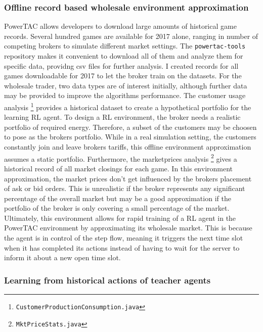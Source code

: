 \subsubsection{Offline record based wholesale environment approximation}%
\label{ssub:offline_record_based_wholesale_environment_approximation}

\ac{PowerTAC} allows developers to download large amounts of historical game records. Several hundred games are
available for 2017 alone, ranging in number of competing brokers to simulate different market settings. The
\texttt{powertac-tools} repository makes it convenient to download all  of them and analyze them for specific data,
providng csv files for further analysis. I created records for all games downloadable for 2017 to let the broker train on
the datasets. For the wholesale trader, two data types are of interest initially, although further data may be provided
to improve the algorithms performance. The customer usage analysis
\footnote{\texttt{CustomerProductionConsumption.java}}
provides a historical dataset to create a
hypothetical portfolio for the learning \ac{RL} agent. To design a \ac{RL} environment, the broker needs a realistic
portfolio of required energy. Therefore, a subset of the customers may be choosen to pose as the brokers portfolio.
While in a real simulation setting, the customers constantly join and leave brokers tariffs, this offline environment
approximation assumes a static portfolio. Furthermore, the marketprices analysis
\footnote{\texttt{MktPriceStats.java}} gives a historical record of all market closings for each game. In this
environment approximation, the market prices don't get influenced by the brokers placement of ask or bid orders. This is
unrealistic if the broker represents any significant percentage of the overall market but may be a good approximation if
the portfolio of the broker is only covering a small percentage of the market. Ultimately, this environment allows for
rapid training of a \ac{RL} agent in the \ac{PowerTAC} environment by approximating its wholesale market. This is
because the agent is in control of the step flow, meaning it triggers the next time slot when it has completed its
actions instead of having to wait for the server to inform it about a new open time slot.

\subsubsection{Learning from historical actions of teacher agents}%
\label{ssub:learning_from_historical_actions_of_teacher_agents}

